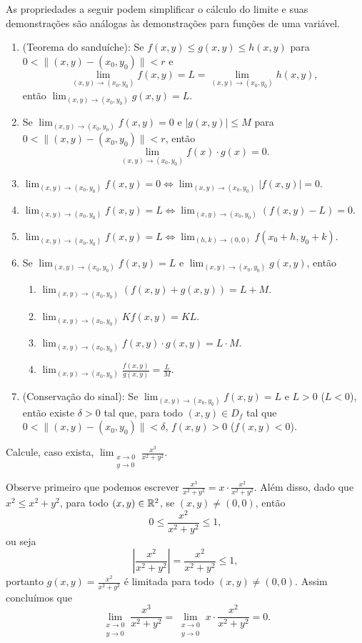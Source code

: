 As propriedades a seguir podem simplificar o cálculo do limite e suas demonstrações são análogas às demonstrações para funções de uma variável.
\begin{enumerate}
    \item (Teorema do sanduíche): Se \(f(x,y) \leq g(x,y) \leq h(x,y)\) para \(0 < \|(x,y) - (x_0,y_0)\| < r\) e \[\lim_{(x,y)\to(x_0,y_0)} f(x,y) = L = \lim_{(x,y)\to (x_0,y_0)} h(x,y),\] então \(\lim_{(x,y)\to(x_0,y_0)} g(x,y) = L\).
    \item Se \(\lim_{(x,y)\to(x_0,y_0)} f(x,y) = 0\) e \(|g(x,y)| \leq M\) para \(0 < \|(x,y) - (x_0,y_0)\| < r\), então \[\lim_{(x,y)\to(x_0,y_0)} f(x)\cdot g(x) = 0.\]
    \item \(\lim_{(x,y)\to(x_0,y_0)} f(x,y) = 0 \Leftrightarrow \lim_{(x,y)\to(x_0,y_0)} |f(x,y)| = 0\).
    \item \(\lim_{(x,y)\to(x_0,y_0)} f(x,y) = L \Leftrightarrow \lim_{(x,y)\to(x_0,y_0)} (f(x,y) - L) = 0 \).
    \item \(\lim_{(x,y)\to(x_0,y_0)} f(x,y) = L \Leftrightarrow \lim_{(h,k)\to(0,0)} f(x_0 +h,y_0+k)\).
    \item Se \(\lim_{(x,y)\to(x_0,y_0)} f(x,y) = L\) e \(\lim_{(x,y)\to(x_0,y_0)} g(x,y)\), então
        \begin{enumerate}
            \item \(\lim_{(x,y)\to(x_0,y_0)} (f(x,y) + g(x,y)) = L + M\).
            \item \(\lim_{(x,y)\to(x_0,y_0)} K f(x,y) = KL\).
            \item \(\lim_{(x,y)\to(x_0,y_0)} f(x,y)\cdot g(x,y) = L\cdot M\).
            \item \(\lim_{(x,y)\to(x_0,y_0)} \frac{f(x,y)}{g(x,y)} = \frac{L}{M}\).
        \end{enumerate}
    \item (Conservação do sinal): Se \(\lim_{(x,y)\to(x_0,y_0)} f(x,y) = L\) e \(L > 0\) {\cb (\(L<0\))}, então existe \(\delta>0\) tal que, para todo \((x,y)\in D_f\) tal que \(0 < \|(x,y) - (x_0,y_0)\| < \delta\), \(f(x,y) > 0\) {\cb (\(f(x,y) < 0\))}.
\end{enumerate}

\begin{example}
    Calcule, caso exista, \(\displaystyle\lim_{\substack{x\to 0 \\ y\to 0}} \frac{x^3}{x^2 + y^2}\).

    Observe primeiro que podemos escrever \(\frac{x^3}{x^2+y^2} = x\cdot\frac{x^2}{x^2+y^2}.\) Além disso, dado que \(x^2 \leq x^2 + y^2\), para todo \((x,y)\in\mathbb{R}^2\), se \((x,y)\neq(0,0)\), então \[0 \leq \frac{x^2}{x^2+y^2} \leq 1,\] ou seja \[\left|\frac{x^2}{x^2+y^2}\right| = \frac{x^2}{x^2+y^2} \leq 1,\] portanto \(g(x,y) = \frac{x^2}{x^2+y^2}\) é limitada para todo \((x,y)\neq(0,0)\). Assim concluímos que \[\displaystyle\lim_{\substack{x\to 0 \\ y\to 0}}\frac{x^3}{x^2+y^2} = \displaystyle\lim_{\substack{x\to 0 \\ y\to 0}} x\cdot\frac{x^2}{x^2+y^2} = 0.\]
\end{example}

